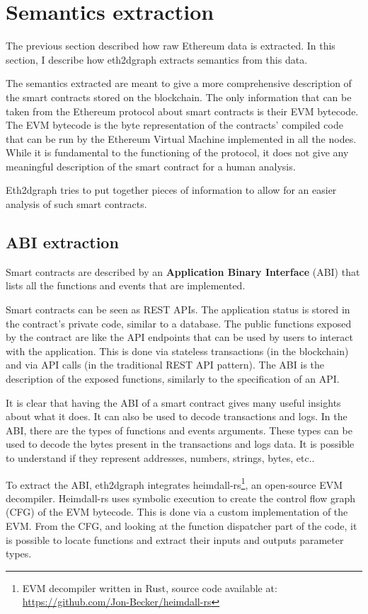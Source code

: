 \section{Semantics extraction}

The previous section described how raw Ethereum data is extracted. In this section, I describe how eth2dgraph extracts semantics from this data.

The semantics extracted are meant to give a more comprehensive description of the smart contracts stored on the blockchain. The only information that can be taken from the Ethereum protocol about smart contracts is their EVM bytecode. The EVM bytecode is the byte representation of the contracts' compiled code that can be run by the Ethereum Virtual Machine implemented in all the nodes. While it is fundamental to the functioning of the protocol, it does not give any meaningful description of the smart contract for a human analysis. 

Eth2dgraph tries to put together pieces of information to allow for an easier analysis of such smart contracts.

\subsection{ABI extraction}

Smart contracts are described by an \textbf{Application Binary Interface} (ABI) that lists all the functions and events that are implemented. 

Smart contracts can be seen as REST APIs. The application status is stored in the contract's private code, similar to a database.
The public functions exposed by the contract are like the API endpoints that can be used by users to interact with the application. This is done via stateless transactions (in the blockchain) and via API calls (in the traditional REST API pattern). The ABI is the description of the exposed functions, similarly to the specification of an API. 

It is clear that having the ABI of a smart contract gives many useful insights about what it does. It can also be used to decode transactions and logs. In the ABI, there are the types of functions and events arguments. These types can be used to decode the bytes present in the transactions and logs data. It is possible to understand if they represent addresses, numbers, strings, bytes, etc..

To extract the ABI, eth2dgraph integrates heimdall-rs\footnote{EVM decompiler written in Rust, source code available at: \url{https://github.com/Jon-Becker/heimdall-rs}}, an open-source EVM decompiler. Heimdall-rs uses symbolic execution to create the control flow graph (CFG) of the EVM bytecode. This is done via a custom implementation of the EVM. From the CFG, and looking at the function dispatcher part of the code, it is possible to locate functions and extract their inputs and outputs parameter types.

